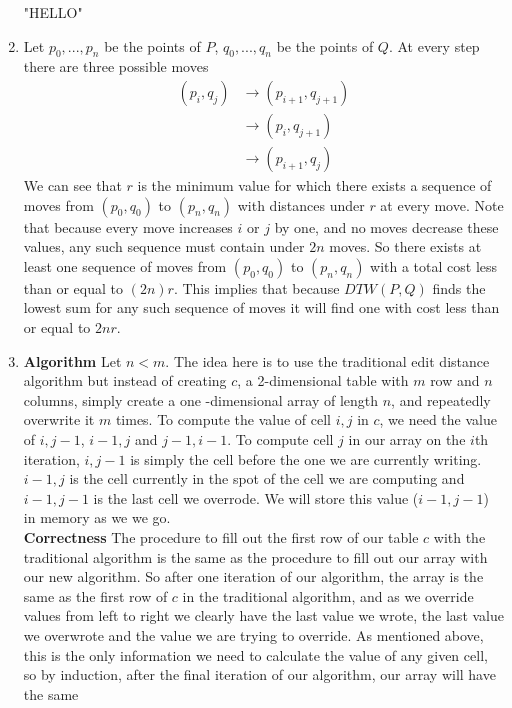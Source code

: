 \documentclass[11pt]{article}
\begin{document}
\begin{enumerate}
\begin{center}
			"HELLO"
			\end{center}
		\item
			Let $p_0,...,p_n$ be the points of $P$, $q_0,...,q_n$
			be the points of $Q$. 
			At every step there are three possible moves
			\begin{align*}
				(p_i,q_j) & \rightarrow (p_{i+1}, q_{j +1})\\
				& \rightarrow (p_{i}, q_{j +1})\\
				& \rightarrow (p_{i+1}, q_{j})
			\end{align*}
			We can see that $r$ is the minimum value for which
			there exists a sequence of moves from $(p_0,q_0)$ to
			$(p_n,q_n)$ with distances under $r$ at every move. Note that because
			every move increases $i$
			or $j$ by one, and no moves decrease these values, any
			such sequence must contain under $2n$ moves. So there
			exists at least one sequence of moves from $(p_0,q_0)$
			to $(p_n,q_n)$ with a total cost less than or equal to
			$(2n)r$. This implies
			that because $DTW(P,Q)$ finds the lowest sum for any
			such sequence of moves
			it will find one with cost less than or equal to
			$2nr$.
		\item
			\textbf{Algorithm}
			Let $n<m$.
			The idea here is to use the traditional edit distance
			algorithm but instead of creating $c$, a 2-dimensional
			table with $m$ row and $n$ columns, simply create a one
			-dimensional array of length $n$, and repeatedly
			overwrite it $m$ times.
			To compute the value of cell $i,j$ in $c$, we need the
			value of $i,j-1$, $i-1,j$ and $j-1,i-1$. To compute
			cell $j$ in our array on the $i$th iteration,
			$i,j-1$ is simply the cell before the one we are currently
			writing. $i-1,j$ is the cell currently in the spot of
			the cell we are computing and $i-1,j-1$ is the last cell
			we overrode. We will store this value ($i-1,j-1$) in memory as we we
			go.\\
			\textbf{Correctness}
			The procedure to fill out the first row of our table $c$ with
			the traditional algorithm is the same as the procedure to
			fill out our array with our new algorithm. So after one
			iteration of our algorithm, the array is the same as the
			first row of $c$ in the traditional algorithm, and as we
			override values from left to right we clearly have the
			last value we wrote, the last value we overwrote and the
			value we are trying to override. As mentioned above, this
			is the only information we need to calculate the value
			of any given cell, so by induction, after the final
			iteration of our algorithm, our array will have the same

\end{enumerate}
\end{document}
